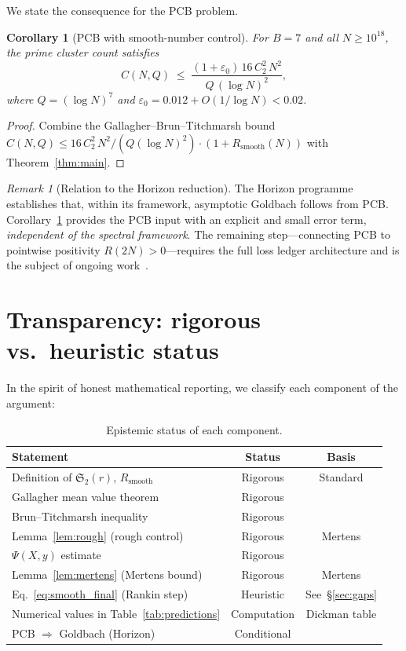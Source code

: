 \documentclass[11pt,reqno]{amsart}
\theoremstyle{plain}
\newtheorem{corollary}[theorem]{Corollary}
\theoremstyle{definition}
\theoremstyle{remark}
\newtheorem{remark}[theorem]{Remark}
\newcommand{\Rsmooth}{R_{\mathrm{smooth}}}
\newcommand{\Sfrak}{\mathfrak{S}_2}
\newcommand{\eps}{\varepsilon}
\begin{document}
We state the consequence for the PCB problem.

\begin{corollary}[PCB with smooth-number control]\label{cor:PCB}
For $B = 7$ and all $N \ge 10^{18}$, the prime cluster count satisfies
\[
  C(N,Q) \;\le\;
  \frac{(1 + \eps_0)\, 16\, C_2^2\, N^2}{Q\,(\log N)^2},
\]
where $Q = (\log N)^7$ and $\eps_0 = 0.012 + O(1/\log N) < 0.02$.
\end{corollary}

\begin{proof}
Combine the Gallagher--Brun--Titchmarsh bound
$C(N,Q) \le 16\, C_2^2\, N^2 / (Q(\log N)^2) \cdot (1 + \Rsmooth(N))$
with Theorem~\ref{thm:main}.
\end{proof}

\begin{remark}[Relation to the Horizon reduction]
The Horizon programme~\cite{G36} establishes that, within its framework,
asymptotic Goldbach follows from PCB.
Corollary~\ref{cor:PCB} provides the PCB input with an explicit
and small error term, \emph{independent of the spectral framework}.
The remaining step---connecting PCB to pointwise positivity
$R(2N) > 0$---requires the full loss ledger architecture and is the
subject of ongoing work~\cite{G37}.
\end{remark}

\section{Transparency: rigorous vs.\ heuristic status}\label{sec:status}

In the spirit of honest mathematical reporting, we classify each
component of the argument:

\begin{table}[h]
\centering
\caption{Epistemic status of each component.}
\label{tab:status}
\smallskip
\renewcommand{\arraystretch}{1.15}
\begin{tabular}{@{}p{5.8cm}cc@{}}
\toprule
\textbf{Statement} & \textbf{Status} & \textbf{Basis} \\
\midrule
Definition of $\Sfrak(r)$, $\Rsmooth$ & Rigorous & Standard \\
Gallagher mean value theorem & Rigorous & \cite{Gallagher1976} \\
Brun--Titchmarsh inequality & Rigorous & \cite{MV2007} \\
Lemma~\ref{lem:rough} (rough control) & Rigorous & Mertens \\
$\Psi(X,y)$ estimate & Rigorous & \cite{HT1986} \\
Lemma~\ref{lem:mertens} (Mertens bound) & Rigorous & Mertens \\
Eq.~\eqref{eq:smooth_final} (Rankin step) & Heuristic & See~\S\ref{sec:gaps} \\
Numerical values in Table~\ref{tab:predictions} & Computation & Dickman table \\
PCB $\Rightarrow$ Goldbach (Horizon) & Conditional & \cite{G36} \\
\bottomrule
\end{tabular}
\end{table}
\end{document}
